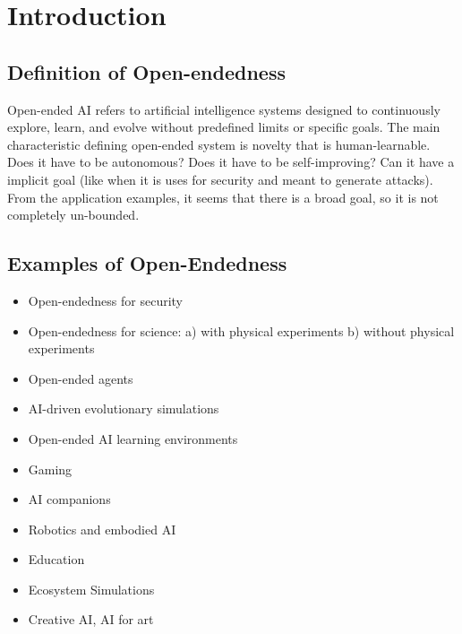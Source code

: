 \documentclass{article}
\begin{document}
\section{Introduction}

\subsection{Definition of Open-endedness}
Open-ended AI refers to artificial intelligence systems designed to continuously explore, learn, and evolve without predefined limits or specific goals. The main characteristic defining open-ended system is novelty that is human-learnable.
Does it have to be autonomous? Does it have to be self-improving? Can it have a implicit goal (like when it is uses for security and meant to generate attacks). From the application examples, it seems that there is a broad goal, so it is not completely un-bounded.
\subsection{Examples of Open-Endedness}

\begin{itemize}
    \item Open-endedness for security
    \item Open-endedness for science: a) with physical experiments b) without physical experiments
    \item Open-ended agents
    \item AI-driven evolutionary simulations
    \item Open-ended AI learning environments
    \item Gaming
    \item AI companions
    \item Robotics and embodied AI
    \item Education
    \item Ecosystem Simulations
    \item Creative AI, AI for art
\end{itemize}
\end{document}

